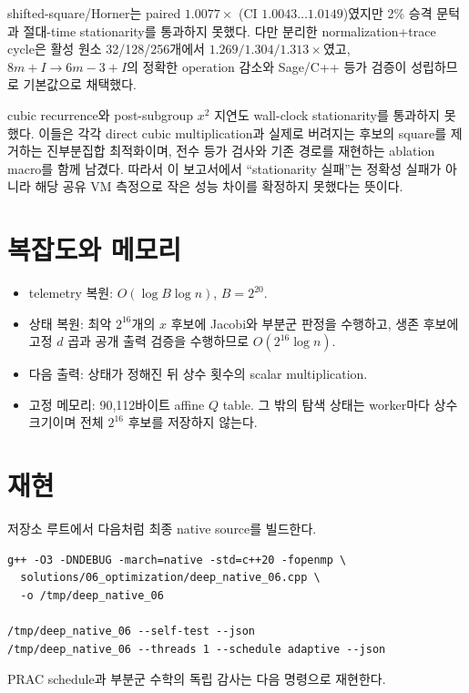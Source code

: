\documentclass[10pt,a4paper]{article}
\begin{document}
shifted-square/Horner는 paired \(1.0077\times\)
(CI \(1.0043\ldots1.0149\))였지만 2\% 승격 문턱과 절대-time
stationarity를 통과하지 못했다. 다만 분리한 normalization+trace cycle은
활성 원소 32/128/256개에서
\(1.269/1.304/1.313\times\)였고,
\(8m+I\to6m-3+I\)의 정확한 operation 감소와 Sage/C++ 등가 검증이
성립하므로 기본값으로 채택했다.

cubic recurrence와 post-subgroup \(x^2\) 지연도 wall-clock
stationarity를 통과하지 못했다. 이들은 각각 direct cubic multiplication과
실제로 버려지는 후보의 square를 제거하는 진부분집합 최적화이며,
전수 등가 검사와 기존 경로를 재현하는 ablation macro를 함께 남겼다.
따라서 이 보고서에서 ``stationarity 실패''는 정확성 실패가 아니라 해당
공유 VM 측정으로 작은 성능 차이를 확정하지 못했다는 뜻이다.

\section{복잡도와 메모리}

\begin{itemize}
  \item telemetry 복원:
        \(O(\log B\log n)\), \(B=2^{20}\).
  \item 상태 복원:
        최악 \(2^{16}\)개의 \(x\) 후보에 Jacobi와 부분군 판정을 수행하고,
        생존 후보에 고정 \(d\) 곱과 공개 출력 검증을 수행하므로
        \(O(2^{16}\log n)\).
  \item 다음 출력:
        상태가 정해진 뒤 상수 횟수의 scalar multiplication.
  \item 고정 메모리:
        90,112바이트 affine \(Q\) table.
        그 밖의 탐색 상태는 worker마다 상수 크기이며 전체 \(2^{16}\)
        후보를 저장하지 않는다.
\end{itemize}

\section{재현}

저장소 루트에서 다음처럼 최종 native source를 빌드한다.

\begin{lstlisting}
g++ -O3 -DNDEBUG -march=native -std=c++20 -fopenmp \
  solutions/06_optimization/deep_native_06.cpp \
  -o /tmp/deep_native_06

/tmp/deep_native_06 --self-test --json
/tmp/deep_native_06 --threads 1 --schedule adaptive --json
\end{lstlisting}

PRAC schedule과 부분군 수학의 독립 감사는 다음 명령으로 재현한다.
\end{document}
